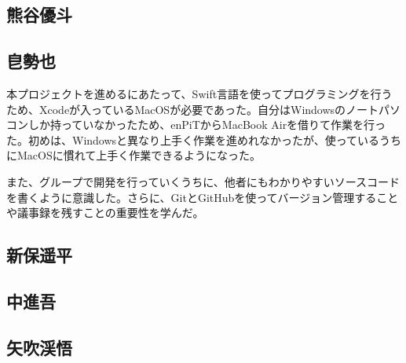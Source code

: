 \documentclass[openany,11pt,papersize]{jsbook}
\begin{document}
\subsection{熊谷優斗}

\subsection{皀勢也}
本プロジェクトを進めるにあたって、Swift言語を使ってプログラミングを行うため、Xcodeが入っているMacOSが必要であった。自分はWindowsのノートパソコンしか持っていなかったため、enPiTからMacBook Airを借りて作業を行った。初めは、Windowsと異なり上手く作業を進めれなかったが、使っているうちにMacOSに慣れて上手く作業できるようになった。
\par
また、グループで開発を行っていくうちに、他者にもわかりやすいソースコードを書くように意識した。さらに、GitとGitHubを使ってバージョン管理することや議事録を残すことの重要性を学んだ。


\subsection{新保遥平}

\subsection{中進吾}

\subsection{矢吹渓悟}
\end{document}
